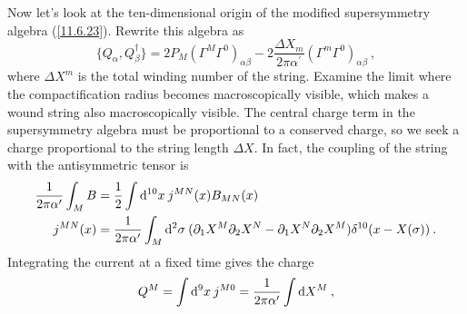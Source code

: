 Now let's look at the ten-dimensional origin of the modified supersymmetry algebra (\ref{11.6.23}). Rewrite this algebra as
\begin{equation}
	\{Q_{\alpha},Q^{\dag}_{\beta}\}=2P_{M}(\Gamma^{M}\Gamma^{0})_{\alpha\beta}-2\frac{\Delta X_{m}}{2\pi\alpha^{\prime}}(\Gamma^{m}\Gamma^{0})_{\alpha\beta}\:,\label{11.6.29}
\end{equation}
where $\Delta X^{m}$ is the total winding number of the string. Examine the limit where the compactification radius becomes macroscopically visible, which makes a wound string also macroscopically visible. The central charge term in the supersymmetry algebra must be proportional to a conserved charge, so we seek a charge proportional to the string length $\Delta X$. In fact, the coupling of the string with the antisymmetric tensor is
\begin{subequations}
	\begin{align}
		\frac{1}{2\pi\alpha^{\prime}}\int_{M} B &=\frac{1}{2}\int \mathrm{d}^{10}x\:j^{MN}(x)B_{MN}(x) \label{11.6.30a} \\
		j^{MN}(x) &= \frac{1}{2\pi\alpha^{\prime}} \int_{M}\mathrm{d}^{2}\sigma\: (\partial_{1}X^{M}\partial_{2}X^{N}-\partial_{1}X^{N}\partial_{2}X^{M})\delta^{10}(x-X(\sigma))\:.\label{11.6.30b}
	\end{align}
\end{subequations}
Integrating the current at a fixed time gives the charge
\begin{equation}
	Q^{M} = \int\mathrm{d}^{9}x\:j^{M0}=\frac{1}{2\pi\alpha^{\prime}}\int\mathrm{d} X^{M} \:, \label{11.6.31}
\end{equation}
